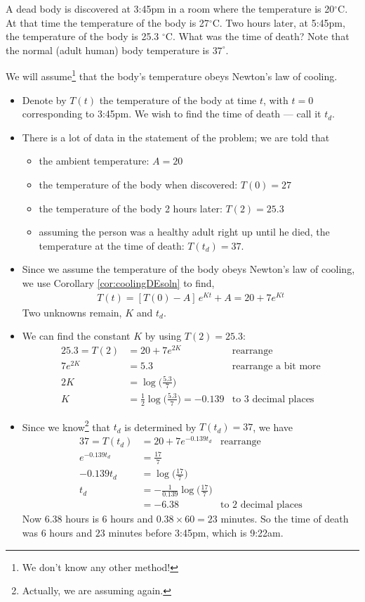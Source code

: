 \begin{eg}\label{eg:SDEcoolingC}
A dead body is discovered at 3:45pm in a room where the temperature is 20$^\circ$C. At
that time the temperature of the body is 27$^\circ$C.  Two hours later, at 5:45pm, the
temperature of the body is 25.3 $^\circ$C. What was the time of death? Note that
the normal (adult human) body temperature is $37^\circ$.

\soln We will assume\footnote{We don't know any other method!} that the body's
temperature obeys Newton's law of cooling.
\begin{itemize}
 \item Denote by $T(t)$ the temperature of the body at time $t$, with $t=0$ corresponding
to 3:45pm. We wish to find the time of death --- call it $t_d$.

\item There is a lot of data in the statement of the problem; we are told that
\begin{itemize}
\item the ambient temperature: $A=20$
\item the temperature of the body when discovered: $T(0)=27$
\item the temperature of the body 2 hours later: $T(2)=25.3$
\item assuming the person was a healthy adult right up until he died, the
temperature at the time of death: $T(t_d)=37$.
\end{itemize}

\item Since we assume the temperature of the body obeys Newton's law of cooling, we use
Corollary \ref{cor:coolingDEsoln} to find,
\begin{align*}
T(t) = [T(0)-A]\,e^{Kt} + A
      =20+7 e^{Kt}
\end{align*}
Two unknowns remain, $K$ and $t_d$.
\item We can find the constant $K$ by using $T(2)=25.3$:
\begin{align*}
25.3=T(2)&= 20+7 e^{2K} & \text{rearrange}\\
7 e^{2K}&=5.3 & \text{rearrange a bit more}\\
2K &= \log\big(\tfrac{5.3}{7}\big) \\
K &= \tfrac{1}{2} \log\big(\tfrac{5.3}{7}\big) = -0.139 & \text{to 3 decimal places}
\end{align*}

\item Since we know\footnote{Actually, we are assuming again.} that $t_d$ is determined
by $T(t_d)=37$, we have
\begin{align*}
37 = T(t_d) &= 20+7 e^{-0.139 t_d} & \text{rearrange}\\
e^{-0.139 t_d} &= \tfrac{17}{7} \\
-0.139 t_d &=\log\big(\tfrac{17}{7}\big) \\
t_d &= -\tfrac{1}{0.139}\log\big(\tfrac{17}{7}\big)\\
& = - 6.38 &\text{to 2 decimal places}
\end{align*}
Now $6.38$ hours is $6$ hours and $0.38\times 60 = 23$ minutes. So the
time of death was $6$ hours and $23$ minutes before 3:45pm, which is
9:22am.


\end{itemize}
\end{eg}
